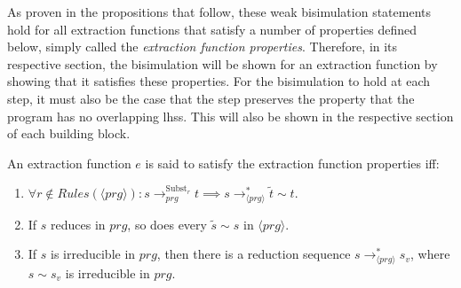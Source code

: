 As proven in the propositions that follow, these weak bisimulation statements hold for all extraction functions that satisfy a number of properties defined below, simply called the \textit{extraction function properties}. Therefore, in its respective section, the bisimulation will be shown for an extraction function by showing that it satisfies these properties. For the bisimulation to hold at each step, it must also be the case that the step preserves the property that the program has no overlapping lhss. This will also be shown in the respective section of each building block.

\begin{definition}
An extraction function $e$ is said to satisfy the extraction function properties iff:

\begin{enumerate}
\item $\forall r \not\in Rules(\langle prg \rangle): s \longrightarrow^{\textrm{Subst}_r}_{prg} t \implies s \longrightarrow^*_{\langle prg \rangle} \widetilde{t} \sim t$.

\item If $s$ reduces in $prg$, so does every $\widetilde{s} \sim s$ in $\langle prg \rangle$.

\item If $s$ is irreducible in $prg$, then there is a reduction sequence $s \longrightarrow^*_{\langle prg \rangle} s_v$, where $s \sim s_v$ is irreducible in $prg$.

\end{enumerate}

\end{definition}

